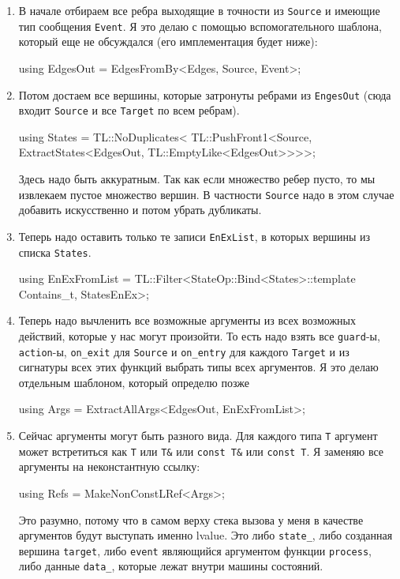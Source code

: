 \documentclass{article}
\begin{document}
{\begin{enumerate}
\item В начале отбираем все ребра выходящие в точности из \verb"Source" и имеющие тип сообщения \verb"Event".
Я это делаю с помощью вспомогательного шаблона, который еще не обсуждался (его имплементация будет ниже):
\begin{cppcode}[\nonumbers]
using EdgesOut = EdgesFromBy<Edges, Source, Event>;
\end{cppcode}

\item Потом достаем все вершины, которые затронуты ребрами из \verb"EngesOut" (сюда входит \verb"Source" и все \verb"Target" по всем ребрам).
\begin{cppcode}[\nonumbers]
using States = TL::NoDuplicates<
    TL::PushFront1<Source, ExtractStates<EdgesOut, TL::EmptyLike<EdgesOut>>>>;
\end{cppcode}
Здесь надо быть аккуратным.
Так как если множество ребер пусто, то мы извлекаем пустое множество вершин.
В частности \verb"Source" надо в этом случае добавить искусственно и потом убрать дубликаты.

\item Теперь надо оставить только те записи \verb"EnExList", в которых вершины из списка \verb"States".
\begin{cppcode}[\nonumbers]
using EnExFromList =
    TL::Filter<StateOp::Bind<States>::template Contains_t, StatesEnEx>;
\end{cppcode} 

\item Теперь надо вычленить все возможные аргументы из всех возможных действий, которые у нас могут произойти.
То есть надо взять все \verb"guard"-ы, \verb"action"-ы, \verb"on_exit" для \verb"Source" и \verb"on_entry" для каждого \verb"Target" и из сигнатуры всех этих функций выбрать типы всех аргументов.
Я это делаю отдельным шаблоном, который определю позже
\begin{cppcode}[\nonumbers]
using Args = ExtractAllArgs<EdgesOut, EnExFromList>;
\end{cppcode} 

\item Сейчас аргументы могут быть разного вида.
Для каждого типа \verb"T" аргумент может встретиться как \verb"T" или \verb"T&" или \verb"const T&" или \verb"const T".
Я заменяю все аргументы на неконстантную ссылку:
\begin{cppcode}[\nonumbers]
using Refs = MakeNonConstLRef<Args>;
\end{cppcode}
Это разумно, потому что в самом верху стека вызова у меня в качестве аргументов будут выступать именно lvalue.
Это либо \verb"state_", либо созданная вершина \verb"target", либо \verb"event" являющийся аргументом функции \verb"process", либо данные \verb"data_", которые лежат внутри машины состояний.


\end{enumerate}}
\end{document}
